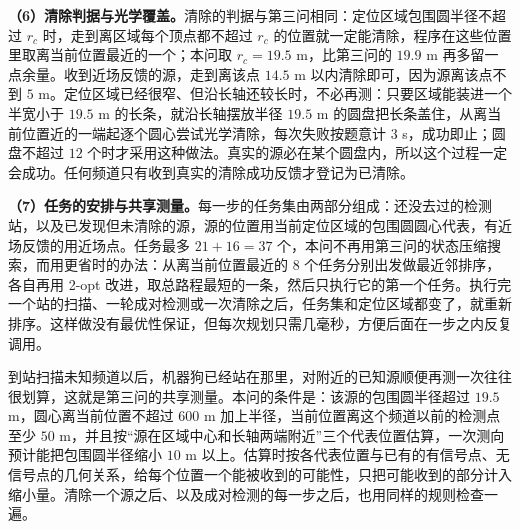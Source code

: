 \begin{center}
\begin{minipage}{\linewidth}
\centering
\QFourNegativeFigure
{}
\label{fig:q4-negative}
\end{minipage}
\end{center}

\textbf{（6）清除判据与光学覆盖。}清除的判据与第三问相同：定位区域包围圆半径不超过 $r_c$ 时，走到离区域每个顶点都不超过 $r_c$ 的位置就一定能清除，程序在这些位置里取离当前位置最近的一个；本问取 $r_c=19.5$ m，比第三问的 $19.9$ m 再多留一点余量。收到近场反馈的源，走到离该点 $14.5$ m 以内清除即可，因为源离该点不到 $5$ m。定位区域已经很窄、但沿长轴还较长时，不必再测：只要区域能装进一个半宽小于 $19.5$ m 的长条，就沿长轴摆放半径 $19.5$ m 的圆盘把长条盖住，从离当前位置近的一端起逐个圆心尝试光学清除，每次失败按题意计 $3$ s，成功即止；圆盘不超过 $12$ 个时才采用这种做法。真实的源必在某个圆盘内，所以这个过程一定会成功。任何频道只有收到真实的清除成功反馈才登记为已清除。

\textbf{（7）任务的安排与共享测量。}每一步的任务集由两部分组成：还没去过的检测站，以及已发现但未清除的源，源的位置用当前定位区域的包围圆圆心代表，有近场反馈的用近场点。任务最多 $21+16=37$ 个，本问不再用第三问的状态压缩搜索，而用更省时的办法：从离当前位置最近的 $8$ 个任务分别出发做最近邻排序，各自再用 2-opt 改进，取总路程最短的一条，然后只执行它的第一个任务。执行完一个站的扫描、一轮成对检测或一次清除之后，任务集和定位区域都变了，就重新排序。这样做没有最优性保证，但每次规划只需几毫秒，方便后面在一步之内反复调用。

到站扫描未知频道以后，机器狗已经站在那里，对附近的已知源顺便再测一次往往很划算，这就是第三问的共享测量。本问的条件是：该源的包围圆半径超过 $19.5$ m，圆心离当前位置不超过 $600$ m 加上半径，当前位置离这个频道以前的检测点至少 $50$ m，并且按“源在区域中心和长轴两端附近”三个代表位置估算，一次测向预计能把包围圆半径缩小 $10$ m 以上。估算时按各代表位置与已有的有信号点、无信号点的几何关系，给每个位置一个能被收到的可能性，只把可能收到的部分计入缩小量。清除一个源之后、以及成对检测的每一步之后，也用同样的规则检查一遍。

